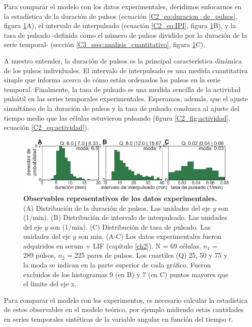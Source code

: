 \documentclass[./main.tex]{subfiles}
\begin{document}
Para comparar el modelo con los datos experimentales, decidimos enfocarnos en la estadística de la duración de pulsos (ecuación \ref{C2_eq:duracion_de_pulsos}, figura \ref{C6_fig:observables_experimentales}A), el intervalo de interpulsado (ecuación \ref{C2_eq:IPI}, figura \ref{C6_fig:observables_experimentales}B), y la tasa de pulsado -definida como el número de pulsos dividido por la duración de la serie temporal- (sección \ref{C3_ssec:analisis_cuantitativo}, figura \ref{C6_fig:observables_experimentales}C). 

A nuestro entender, la duración de pulsos es la principal característica dinámica de los pulsos individuales. El intervalo de interpulsado es una medida cuantitativa simple que informa acerca de cómo están ordenados los pulsos en la serie temporal. Finalmente, la tasa de pulsado es una medida sencilla de la actividad pulsátil en las series temporales experimentales. Esperamos, además, que el ajuste simultáneo de la duración de pulsos y la tasa de pulsado conduzca al ajuste del tiempo medio que las células estuvieron pulsando (figura \ref{C2_fig:actividad}, ecuación \ref{C2_eq:actividad}). 

\begin{figure}
    \centering
    \includegraphics[width=1\columnwidth]{figures/chapter6/C6_experimental_stats.pdf} 
    \caption{\textbf{Observables representativos de los datos experimentales.} (A) Distribución de la duración de pulsos. Las unidades del eje $y$ son (1/min). (B) Distribución de intervalo de interpulsado. Las unidades del eje $y$ son (1/min). (C) Distribución de tasa de pulsado. Las unidades del eje $y$ son min. (A-C) Los datos experimentales fueron adquiridos en serum + LIF (capítulo \ref{ch2}). N = 69 células, $n_1$ = 289 pulsos, $n_2$ = 225 pares de pulsos. Los cuartiles (Q) 25, 50 y 75 y la moda se indican en la parte superior de cada gráfico. Fueron excluidos de los histogramas 9 (en B) y 7 (en C) puntos mayores que el límite del eje x.}
    \label{C6_fig:observables_experimentales}
\end{figure}

Para comparar el modelo con los experimentos, es necesario calcular la estadística de estos observables en el modelo teórico, por ejemplo midiendo estas cantidades en series temporales sintéticas de la variable angular \xx en función del tiempo $t$. 
\end{document}
